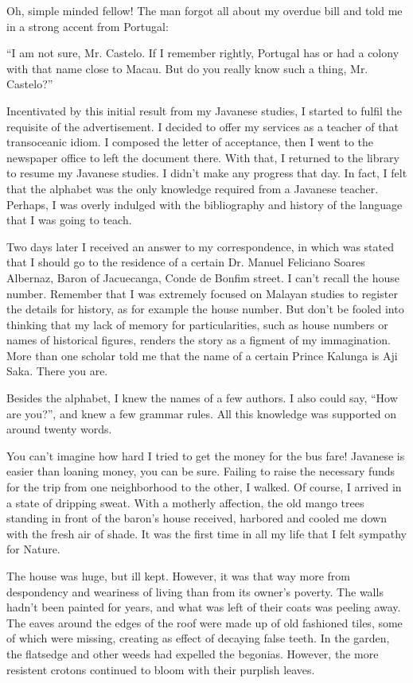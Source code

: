 \documentclass[a4paper,12pt]{book}
\begin{document}
Oh, simple minded fellow! The man forgot all about
my overdue bill and told me in a strong accent
from Portugal:

``I am not sure, Mr. Castelo. If I remember rightly,
Portugal has or had a colony with that name
close to Macau. But do you
really know such a thing, Mr. Castelo?''

Incentivated by this initial result from
my Javanese studies,
I started to fulfil the requisite of the advertisement.
I decided to offer my services as a teacher of
that transoceanic idiom. I composed the letter of
acceptance, then I went to the newspaper
office to left the document there.
With that, I returned
to the library to resume my Javanese studies.
I didn't make any progress that day. In fact, I
felt that the alphabet was the only knowledge
required from a Javanese teacher. Perhaps,
I was overly indulged with the
bibliography and history of the
language that I was going to teach.

Two days later I received an answer to my correspondence,
in which was stated
that I should go to the residence of
a certain Dr. Manuel Feliciano Soares Albernaz,
Baron of Jacuecanga,
Conde de Bonfim street.
I can't recall the house
number. Remember that  I was extremely focused
on Malayan studies to register the details
for history, as for example the house number.
But don't be fooled into thinking that
my lack of memory for particularities,
such as house numbers or names of historical
figures, renders the story as a figment
of my immagination. More than one scholar
told me that the  name of a certain
Prince Kalunga 
is Aji Saka. 
There you are.

Besides the alphabet, I knew the names
of a few authors. I also could say, ``How are
you?'', and knew a few grammar rules.
All this knowledge was supported
on around twenty words.

You can't imagine how hard I tried
to get the money for the bus fare! Javanese
is easier than loaning money,
you can be sure. Failing to raise
the necessary funds for the trip from
one neighborhood to the other, I walked.
Of course, I arrived in a state of dripping sweat.
With a motherly
affection, the old
mango trees standing in front
of the baron's house received, harbored
and cooled me down with the fresh air of shade.
It was the first time in all my life
that I felt sympathy for Nature.

The house was huge, but ill kept.
However, it was that way more from
despondency and weariness of living
than from its owner's poverty.
The walls hadn't been
painted for years, and what was left
of their coats was peeling away.
The eaves around the edges of the
roof were made up of old fashioned tiles,
some of which were missing, creating
as effect of decaying false teeth.
In the garden, the
flatsedge and other weeds had expelled the 
begonias. However, the more resistent crotons
continued to bloom with their purplish leaves.
\end{document}
